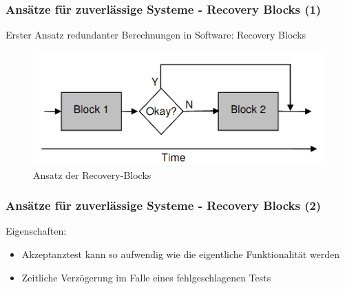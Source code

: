 \begin{frame}
	\frametitle{Ansätze für zuverlässige Systeme - Recovery Blocks (1)}
	Erster Ansatz redundanter Berechnungen in Software: Recovery Blocks \cite{Horning:1974:PSE:647641.733522}
	\begin{figure}
		\includegraphics[scale=0.3]{grafiken/recovery-block.png}		
		\caption{Ansatz der Recovery-Blocks
			\footnotemark		
		}		
	\end{figure}
\end{frame}
%
%
\begin{frame}
	\frametitle{Ansätze für zuverlässige Systeme - Recovery Blocks (2)}
	Eigenschaften:
	\begin{itemize}
		\item Akzeptanztest kann so aufwendig wie die eigentliche Funktionalität werden
		\item Zeitliche Verzögerung im Falle eines fehlgeschlagenen Tests
	\end{itemize}	
\end{frame}